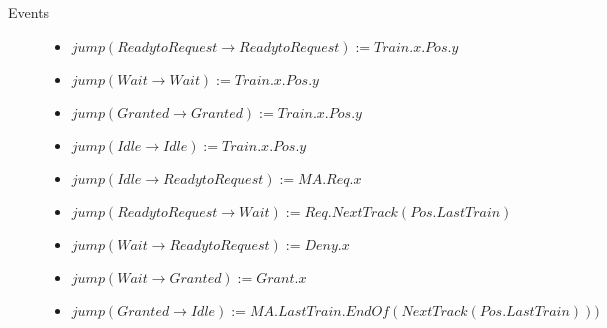 \begin{mydef}
\begin{description}
\begin{itemize}
	\end{itemize}

\item[Events] \hspace*{0mm}
\begin{itemize}
\item $jump(Ready to Request \to Ready to Request) := Train.x.Pos.y$
	\item $jump(Wait \to Wait) := Train.x.Pos.y$
	\item $jump(Granted \to Granted) := Train.x.Pos.y $
         \item $jump(Idle \to Idle) := Train.x.Pos.y$
	\item $jump(Idle \to Ready to Request) := MA.Req.x $
	\item $jump(Ready to Request \to Wait) := Req.NextTrack(Pos.LastTrain)$
	\item $jump(Wait \to Ready to Request) := Deny.x$
	\item $jump(Wait \to Granted) := Grant.x$
	\item $jump(Granted \to Idle) := MA.LastTrain.EndOf(NextTrack(Pos.LastTrain)))$
\end{itemize}

\end{description}

\end{mydef}

\FloatBarrier

